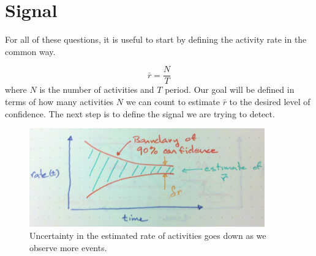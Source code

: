 \documentclass{article}
\begin{document}





\section{Signal} 




For all of these questions, it is useful to start by defining the activity rate in the common way.

\begin{equation}
    \label{eq:rateEst}
    \bar{r} = \frac{N}{T}
\end{equation}
where $N$ is the number of activities and $T$ period.  Our goal will be defined in terms of how many activities $N$ we can count to estimate $\bar{r}$ to the desired level of confidence. The next step is to define the signal we are trying to detect.



%
\begin{figure}[h]
	\begin{center}
		\includegraphics[width=4.0in]{./imgs/confidence.jpg}
	\end{center}
	\caption{Uncertainty in the estimated rate of activities goes down as we observe more events. }
    	\label{fig:confidence}
\end{figure}
%
%
\end{document}
